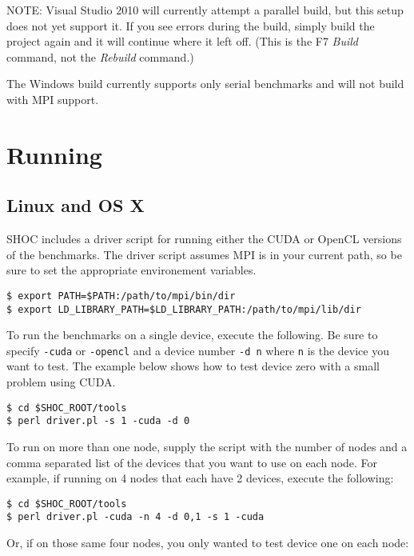\documentclass[11pt]{article}
\begin{document}
NOTE: Visual Studio 2010 will currently attempt
a parallel build, but this setup does not yet
support it.  If you see errors during the build,
simply build the project again and it will 
continue where it left off.  (This is
the F7 {\it Build} command, not the {\it Rebuild}
command.)

The Windows build currently supports only serial
benchmarks and will not build with MPI support.

\section{Running}\label{sec:running}

\subsection{Linux and OS X}

SHOC includes a driver script for running either the CUDA or OpenCL versions
of the benchmarks. The driver script assumes MPI is in your current path,
so be sure to set the appropriate environement variables.

\begin{Verbatim}[frame=single]
$ export PATH=$PATH:/path/to/mpi/bin/dir
$ export LD_LIBRARY_PATH=$LD_LIBRARY_PATH:/path/to/mpi/lib/dir
\end{Verbatim}

To run the benchmarks on a single device, execute the following. Be sure
to specify \verb+-cuda+ or \verb+-opencl+ and a device number \verb+-d n+
where \verb+n+ is the device you want to test. The example below shows how
to test device zero with a small problem using CUDA.

\begin{Verbatim}[frame=single]
$ cd $SHOC_ROOT/tools
$ perl driver.pl -s 1 -cuda -d 0
\end{Verbatim}

To run on more than one node, supply the script with the number of nodes and 
a comma separated list of the devices that you want to use on each node. For
example, if running on 4 nodes that each have 2 devices, execute the following: 

\begin{Verbatim}[frame=single]
$ cd $SHOC_ROOT/tools
$ perl driver.pl -cuda -n 4 -d 0,1 -s 1 -cuda
\end{Verbatim}

Or, if on those same four nodes, you only wanted to test device one on each node:
\end{document}
